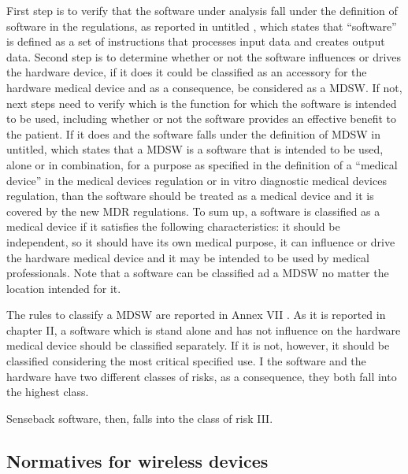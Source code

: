\documentclass{Configuration_Files/PoliMi3i_thesis}
\begin{document}
First step is to verify that the software under analysis fall under the definition of software in the regulations, as reported in \cite{PublicHealthEuropean2024} untitled , which states that “software” is defined as a set of instructions that processes input data and creates output data. Second step is to determine whether or not the software influences or drives the hardware device, if it does it could be classified as an accessory for the hardware medical device and as a consequence, be considered as a MDSW. If not, next steps need to verify which is the function for which the software is intended to be used, including whether or not the software provides an effective benefit to the patient. If it does and the software falls under the definition of MDSW in \cite{PublicHealthEuropean2024} untitled, which states that a MDSW is a software that is intended to be used, alone or in combination, for a purpose as specified in the definition of a “medical device” in the medical devices regulation or in vitro diagnostic medical devices regulation, than the software should be treated as a medical device and it is covered by the new MDR regulations.
To sum up, a software is classified as a medical device if it satisfies the following characteristics: it should be independent, so it should have its own medical purpose, it can influence or drive the hardware medical device and it may be intended to be used by medical professionals. Note that a software can be classified ad a MDSW no matter the location intended for it.

The rules to classify a MDSW are reported in Annex VII \cite{massimopANNEXVIII2019}. As it is reported in chapter II, a software which is stand alone and has not influence on the hardware medical device should be classified separately. If it is not, however, it should be classified considering the most critical specified use. I the software and the hardware have two different classes of risks, as a consequence, they both fall into the highest class.

Senseback software, then, falls into the class of risk III. 

\subsection{Normatives for wireless devices}
\end{document}
